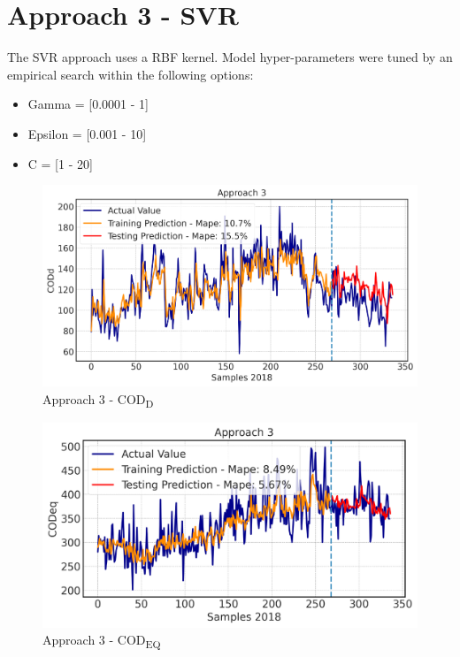 \section{Approach 3 - SVR}
The \ac{SVR} approach uses a \ac{RBF} kernel. Model hyper-parameters were tuned by an empirical search within the following options:

\begin{itemize}
    \item Gamma = [0.0001 - 1]
    \item Epsilon = [0.001 - 10]
    \item C = [1 - 20]
\end{itemize}
\begin{figure}[h!]
\centering
\includegraphics[width=\linewidth]{figures/Ch5/CODd-3.pdf}
\caption{Approach 3 - COD\textsubscript{D}}
\label{f:App3-codd}
\end{figure}

\begin{figure}[h!]
\centering
\includegraphics[width=\linewidth]{figures/Ch5/CODeq-3.pdf}
\caption{Approach 3 - COD\textsubscript{EQ}}
\label{f:App3-codeq}
\end{figure}


